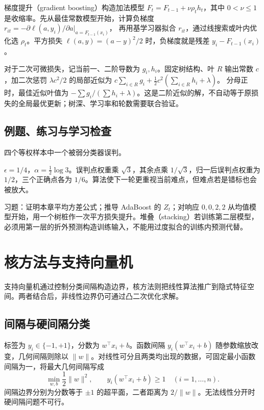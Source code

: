 \documentclass[UTF8,12pt,a4paper,fontset=fandol]{ctexbook}
\begin{document}
梯度提升（gradient boosting）构造加法模型 $F_t=F_{t-1}+\nu\rho_th_t$，其中 $0<\nu\leq1$ 是收缩率。先从最佳常数模型开始，计算负梯度
$r_{it}=-\partial\ell(a,y_i)/\partial a|_{a=F_{t-1}(x_i)}$，
再用基学习器拟合 $r_{it}$，通过线搜索或叶内优化选 $\rho_t$。平方损失 $\ell(a,y)=(a-y)^2/2$ 时，负梯度就是残差 $y_i-F_{t-1}(x_i)$。

对于二次可微损失，记当前一、二阶导数为 $g_i,h_i$。固定树结构、叶 $R$ 输出常数 $c$，加二次惩罚 $\lambda c^2/2$ 的局部近似为
$c\sum_{i\in R}g_i+\frac12c^2(\sum_{i\in R}h_i+\lambda)$。
分母正时，最佳近似叶值为 $-\sum g_i/(\sum h_i+\lambda)$。这是二阶近似的解，不自动等于原损失的全局最优更新；树深、学习率和轮数需要联合验证。

\section{例题、练习与学习检查}

\begin{example}[提升如何重分配注意力]
四个等权样本中一个被弱分类器误判。
\end{example}
\begin{solve}
$\epsilon=1/4$，$\alpha=\frac12\log3$。误判点权重乘 $\sqrt3$，其余点乘 $1/\sqrt3$，归一后误判点权重为 $1/2$，三个正确点各为 $1/6$。算法使下一轮更重视当前难点，但难点若是错标也会被放大。
\end{solve}

习题：证明本章平均方差公式；推导 AdaBoost 的 $Z_t$；对响应 $0,0,2,2$ 从均值模型开始，用一个树桩作一次平方损失提升。堆叠（stacking）若训练第二层模型，必须用第一层的折外预测构造训练输入，不能用过度拟合的训练内预测代替。

\chapter{核方法与支持向量机}
\label{chap:ml-kernels}

支持向量机通过控制分类间隔构造边界，核方法则把线性算法推广到隐式特征空间。两者结合后，非线性边界仍可通过凸二次优化求解。

\section{间隔与硬间隔分类}

标签为 $y_i\in\{-1,+1\}$，分数为 $w^\top x_i+b$。函数间隔 $y_i(w^\top x_i+b)$ 随参数缩放改变，几何间隔则除以 $\|w\|$。对线性可分且两类均出现的数据，可固定最小函数间隔为一，将最大几何间隔写成
\begin{equation}
 \min_{w,b}\frac12\|w\|^2,\qquad
 y_i(w^\top x_i+b)\geq1\quad(i=1,\ldots,n).
 \label{eq:ml-svm-primal}
\end{equation}
间隔边界分别为分数等于 $\pm1$ 的超平面，二者距离为 $2/\|w\|$。无法线性分开时硬间隔问题不可行。
\end{document}
